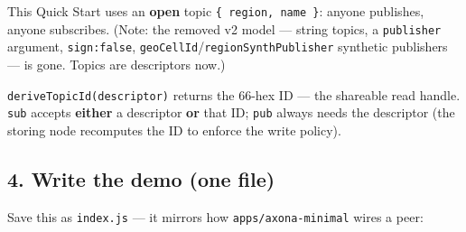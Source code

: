 \documentclass[
  nobib]{tufte-handout}
\begin{document}
This Quick Start uses an \textbf{open} topic
\texttt{\{\ region,\ name\ \}}: anyone publishes, anyone subscribes.
(Note: the removed v2 model --- string topics, a \texttt{publisher}
argument, \texttt{sign:false},
\texttt{geoCellId}/\texttt{regionSynthPublisher} synthetic publishers
--- is gone. Topics are descriptors now.)

\texttt{deriveTopicId(descriptor)} returns the 66-hex ID --- the
shareable read handle. \texttt{sub} accepts \textbf{either} a descriptor
\textbf{or} that ID; \texttt{pub} always needs the descriptor (the
storing node recomputes the ID to enforce the write policy).

\subsection{4. Write the demo (one file)}\label{write-the-demo-one-file}

Save this as \texttt{index.js} --- it mirrors how
\texttt{apps/axona-minimal} wires a peer:
\end{document}
